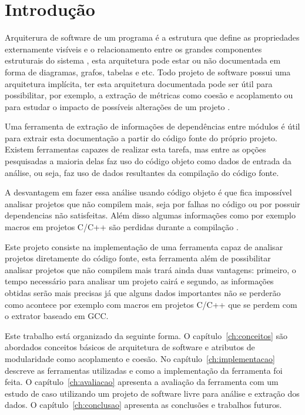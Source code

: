 \chapter{Introdução}

Arquiterura de software de um programa é a estrutura que define as propriedades
externamente visíveis e o relacionamento entre os grandes componentes
estruturais do sistema \cite{engenhariaDeSoftwarePressman}, esta arquitetura
pode estar ou não documentada em forma de diagramas, grafos, tabelas e etc.
Todo projeto de software possui uma arquitetura implícita, ter esta arquitetura
documentada pode ser útil para possibilitar, por exemplo, a extração de
métricas como coesão e acoplamento ou para estudar o impacto de possíveis
alterações de um projeto \cite{mata26-terceiro-projeto-piloto}.

Uma ferramenta de extração de informações de dependências entre módulos é útil
para extrair esta documentação a partir do código fonte do próprio projeto.
Existem ferramentas capazes de realizar esta tarefa, mas entre as opções
pesquisadas \cite{sourceVersusObjectCodeExtraction} a maioria delas faz uso do
código objeto como dados de entrada da análise, ou seja, faz uso de dados
resultantes da compilação do código fonte.

A desvantagem em fazer essa análise usando código objeto é que fica impossível
analisar projetos que não compilem mais, seja por falhas no código ou por
possuir dependencias não satisfeitas. Além disso algumas informações como por
exemplo macros em projetos C/C++ são perdidas durante a
compilação \cite{sourceVersusObjectCodeExtraction}.

Este projeto consiste na implementação de uma ferramenta capaz de analisar
projetos diretamente do código fonte, esta
ferramenta além de possibilitar analisar projetos que não compilem mais trará
ainda duas vantagens: primeiro, o tempo necessário para analisar um projeto
cairá e segundo, as informações obtidas serão mais precisas já que alguns dados
importantes não se perderão como acontece por exemplo com macros em projetos
C/C++ \cite{sourceVersusObjectCodeExtraction} que se perdem com o extrator
baseado em GCC.

Este trabalho está organizado da seguinte forma. O capítulo~\ref{ch:conceitos}
são abordados conceitos básicos de arquitetura de software e atributos de
modularidade como acoplamento e coesão. No capítulo~\ref{ch:implementacao}
descreve as ferramentas utilizadas e como a implementação da ferramenta foi
feita. O capítulo~\ref{ch:avaliacao} apresenta a avaliação da ferramenta com um
estudo de caso utilizando um projeto de software livre para análise e extração
dos dados. O capítulo~\ref{ch:conclusao} apresenta as conclusões e trabalhos
futuros.


